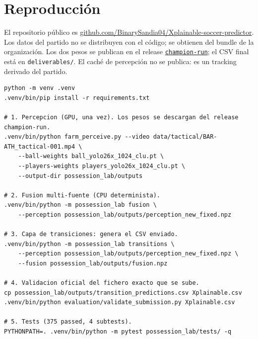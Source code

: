 \documentclass[10pt,a4paper]{article}
\begin{document}
\section{Reproducción}

El repositorio público es
\href{https://github.com/BinarySandia04/Xplainable-soccer-predictor}{github.com/BinarySandia04/Xplainable-soccer-predictor}.
Los datos del partido no se distribuyen con el código; se obtienen del bundle de la organización.
Los dos pesos se publican en el release
\href{https://github.com/BinarySandia04/Xplainable-soccer-predictor/releases/tag/champion-run}{\texttt{champion-run}};
el CSV final está en \texttt{deliverables/}. El caché de percepción no se publica: es un tracking
derivado del partido.

\begin{lstlisting}
python -m venv .venv
.venv/bin/pip install -r requirements.txt

# 1. Percepcion (GPU, una vez). Los pesos se descargan del release champion-run.
.venv/bin/python farm_perceive.py --video data/tactical/BAR-ATH_tactical-001.mp4 \
    --ball-weights ball_yolo26x_1024_clu.pt \
    --players-weights players_yolo26x_1024_clu.pt \
    --output-dir possession_lab/outputs

# 2. Fusion multi-fuente (CPU determinista).
.venv/bin/python -m possession_lab fusion \
    --perception possession_lab/outputs/perception_new_fixed.npz

# 3. Capa de transiciones: genera el CSV enviado.
.venv/bin/python -m possession_lab transitions \
    --perception possession_lab/outputs/perception_new_fixed.npz \
    --fusion possession_lab/outputs/fusion.npz

# 4. Validacion oficial del fichero exacto que se sube.
cp possession_lab/outputs/transition_predictions.csv Xplainable.csv
.venv/bin/python evaluation/validate_submission.py Xplainable.csv

# 5. Tests (375 passed, 4 subtests).
PYTHONPATH=. .venv/bin/python -m pytest possession_lab/tests/ -q
\end{lstlisting}
\end{document}
